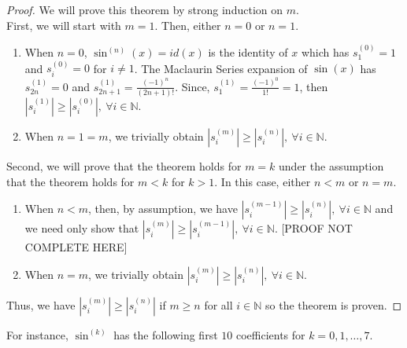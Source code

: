 \documentclass{article}
\begin{document}
    \begin{proof}
        We will prove this theorem by strong induction on $m$.\\
        
        First, we will start with $m = 1$. Then, either $n = 0$ or $n = 1$.
        
        \begin{enumerate}
            \item When $n = 0$, $\sin^{(n)}(x) = id(x)$ is the identity of $x$ which has $s_1^{(0)} = 1$ and $s_i^{(0)} = 0$ for $i \neq 1$. The Maclaurin Series expansion of $\sin(x)$ has $s_{2n}^{(1)} = 0$ and $s_{2n+1}^{(1)} = \frac{(-1)^n}{(2n+1)!}$. Since, $s_{1}^{(1)} = \frac{(-1)^0}{1!} = 1$, then $\left|s_{i}^{(1)}\right| \geq \left|s_{i}^{(0)}\right|,\ \forall i \in \mathbb{N}$. 
            
            \item When $n = 1 = m$, we trivially obtain $\left|s_{i}^{(m)}\right| \geq \left|s_{i}^{(n)}\right|,\ \forall i \in \mathbb{N}$.
        \end{enumerate}
        
        Second, we will prove that the theorem holds for $m = k$ under the assumption that the theorem holds for $m < k$ for $k > 1$. In this case, either $n < m$ or $n = m$.
        
        \begin{enumerate}
            \item When $n < m$, then, by assumption, we have $\left|s_{i}^{(m-1)}\right| \geq \left|s_{i}^{(n)}\right|,\ \forall i \in \mathbb{N}$ and we need only show that $\left|s_{i}^{(m)}\right| \geq \left|s_{i}^{(m-1)}\right|,\ \forall i \in \mathbb{N}$. [PROOF NOT COMPLETE HERE]
            
            \item When $n = m$, we trivially obtain $\left|s_{i}^{(m)}\right| \geq \left|s_{i}^{(n)}\right|,\ \forall i \in \mathbb{N}$.
        \end{enumerate}
        
        Thus, we have $\left|s_i^{(m)}\right| \geq \left|s_i^{(n)}\right|$ if $m \geq n$ for all $i \in \mathbb{N}$ so the theorem is proven.
    \end{proof}

    For instance, $\sin^{(k)}$ has the following first $10$ coefficients for $k = 0, 1, \ldots, 7$.
\end{document}
